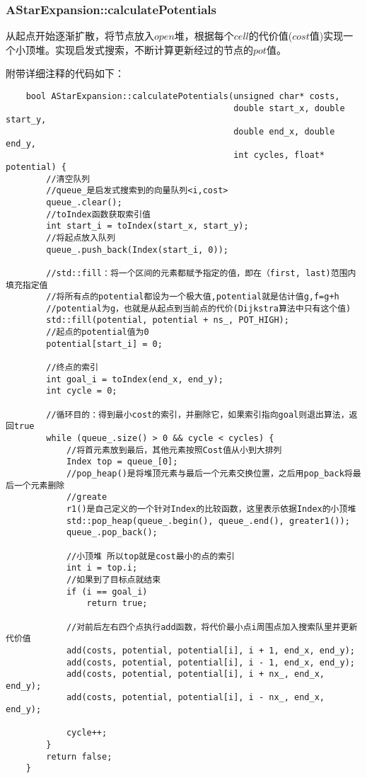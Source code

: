 \documentclass[9pt, oneside]{book}
\begin{document}
\subsubsection{AStarExpansion::calculatePotentials}

从起点开始逐渐扩散，将节点放入$open$堆，根据每个$cell$的代价值($cost$值)实现一个小顶堆。实现启发式搜索，不断计算更新经过的节点的$pot$值。

附带详细注释的代码如下：

\small
\begin{verbatim}
    bool AStarExpansion::calculatePotentials(unsigned char* costs, 
                                             double start_x, double start_y, 
                                             double end_x, double end_y,
                                             int cycles, float* potential) {
        //清空队列
        //queue_是启发式搜索到的向量队列<i,cost>
        queue_.clear();
        //toIndex函数获取索引值
        int start_i = toIndex(start_x, start_y);
        //将起点放入队列
        queue_.push_back(Index(start_i, 0));

        //std::fill：将一个区间的元素都赋予指定的值，即在（first, last)范围内填充指定值
        //将所有点的potential都设为一个极大值,potential就是估计值g,f=g+h
        //potential为g，也就是从起点到当前点的代价(Dijkstra算法中只有这个值)
        std::fill(potential, potential + ns_, POT_HIGH);
        //起点的potential值为0
        potential[start_i] = 0;

        //终点的索引
        int goal_i = toIndex(end_x, end_y);
        int cycle = 0;

        //循环目的：得到最小cost的索引，并删除它，如果索引指向goal则退出算法，返回true
        while (queue_.size() > 0 && cycle < cycles) {
            //将首元素放到最后，其他元素按照Cost值从小到大排列
            Index top = queue_[0];
            //pop_heap()是将堆顶元素与最后一个元素交换位置，之后用pop_back将最后一个元素删除
            //greate    
            r1()是自己定义的一个针对Index的比较函数，这里表示依据Index的小顶堆
            std::pop_heap(queue_.begin(), queue_.end(), greater1());
            queue_.pop_back();

            //小顶堆 所以top就是cost最小的点的索引
            int i = top.i;
            //如果到了目标点就结束
            if (i == goal_i)
                return true;

            //对前后左右四个点执行add函数，将代价最小点i周围点加入搜索队里并更新代价值
            add(costs, potential, potential[i], i + 1, end_x, end_y);
            add(costs, potential, potential[i], i - 1, end_x, end_y);
            add(costs, potential, potential[i], i + nx_, end_x, end_y);
            add(costs, potential, potential[i], i - nx_, end_x, end_y);

            cycle++;
        }
        return false;
    }
\end{verbatim}
\normalsize
\end{document}
